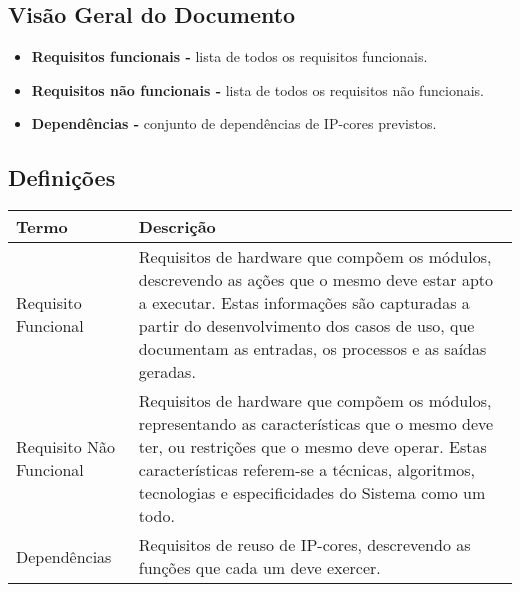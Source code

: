 \documentclass{article}
\begin{document}
\subsection{Visão Geral do Documento}
  \begin{itemize}
   \item \textbf{Requisitos funcionais -} lista de todos os requisitos funcionais.
   \item \textbf{Requisitos não funcionais -} lista de todos os requisitos não funcionais.
   \item \textbf{Dependências -} conjunto de dependências de IP-cores previstos.
  \end{itemize}

  \subsection{Definições}
  
  \FloatBarrier
  \begin{table}[H]
    \begin{center}
      \begin{tabular}[pos]{|m{2.5cm} | m{11.5cm}|} 
        \hline
        \cellcolor[gray]{0.9}\textbf{Termo} & \cellcolor[gray]{0.9}\textbf{Descrição} \\ \hline
        \flushright Requisito Funcional     & Requisitos de hardware que compõem os módulos, descrevendo as ações que o 
                                    mesmo deve estar apto a executar. Estas informações são capturadas a partir 
                                    do desenvolvimento dos casos de uso, que documentam as entradas, os processos 
                                    e as saídas geradas.  \\ \hline
        \flushright Requisito Não \mbox{Funcional} & Requisitos de hardware que compõem os módulos, representando as características 
                                    que o mesmo deve ter, ou restrições que o mesmo deve operar. Estas características
                                    referem-se a técnicas, algoritmos, tecnologias e especificidades do Sistema como um todo.  \\ \hline
        \flushright Dependências              & Requisitos de reuso de IP-cores, descrevendo as funções que cada um deve exercer. \\ \hline
      \end{tabular}
    \end{center}
  \end{table}  
\end{document}
